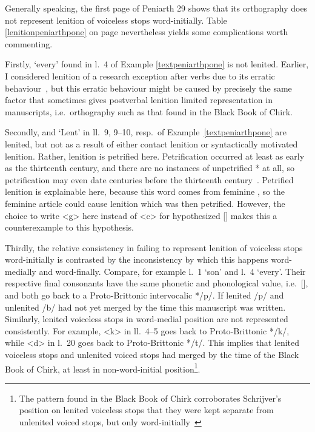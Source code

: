 Generally speaking, the first page of Peniarth 29 shows that its orthography does not represent lenition of voiceless stops word-initially. Table \ref{lenitionpeniarthpone} on page \pageref{lenitionpeniarthpone} nevertheless yields some complications worth commenting.

Firstly,  `every' found in l.~4 of Example \ref{textpeniarthpone} is not lenited. Earlier, I considered lenition of  a research exception after verbs due to its erratic behaviour~\parencite[24]{van_sluis_development_2014}, but this erratic behaviour might be caused by precisely the same factor that sometimes gives postverbal lenition limited representation in manuscripts, i.e.\ orthography such as that found in the Black Book of Chirk.

Secondly,  and  `Lent' in ll.~9, 9--10, resp.\ of Example~\ref{textpeniarthpone} are lenited, but not as a result of either contact lenition or syntactically motivated lenition. Rather, lenition is petrified here. Petrification occurred at least as early as the thirteenth century, and there are no instances of unpetrified * at all, so petrification may even date centuries before the thirteenth century~\parencite[Grawys, Garawys]{bevan_geiriadur_2014}. Petrified lenition is explainable here, because this word comes from feminine , so the feminine article could cause lenition which was then petrified. However, the choice to write <g> here instead of <c> for hypothesized [\gd] makes this a counterexample to this hypothesis. 

Thirdly, the relative consistency in failing to represent lenition of voiceless stops word-initially is contrasted by the inconsistency by which this happens word-medially and word-finally. Compare, for example l.~1  `son' and l.~4  `every'. Their respective final consonants have the same phonetic and phonological value, i.e.\ [\bd], and both go back to a Proto-Brittonic intervocalic */p/. If lenited /p/ and unlenited /b/ had not yet merged by the time this manuscript was written. Similarly, lenited voiceless stops in word-medial position are not represented consistently. For example, <k> in ll.~4–5  goes back to Proto-Brittonic */k/, while <d> in l.~20  goes back to Proto-Brittonic */t/. This implies that lenited voiceless stops and unlenited voiced stops had merged by the time of the Black Book of Chirk, at least in non-word-initial position\footnote{The pattern found in the Black Book of Chirk corroborates Schrijver's position on lenited voiceless stops that they were kept separate from unlenited voiced stops, but only word-initially~\autocite[31]{schrijver_old_2011}}.

